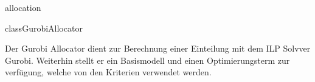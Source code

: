 \begin{texdocpackage}{allocation}
\begin{texdocclass}{class}{GurobiAllocator}
\label{texdoclet:allocation.GurobiAllocator}
\begin{texdocclassintro}
Der Gurobi Allocator dient zur Berechnung einer Einteilung mit dem ILP Solvver Gurobi. Weiterhin stellt er ein Basismodell und einen Optimierungsterm zur verfügung, welche von den Kriterien verwendet werden.\end{texdocclassintro}
\begin{texdocclassconstructors}
\end{texdocclassconstructors}
\begin{texdocclassmethods}
\end{texdocclassmethods}
\end{texdocclass}


\end{texdocpackage}




